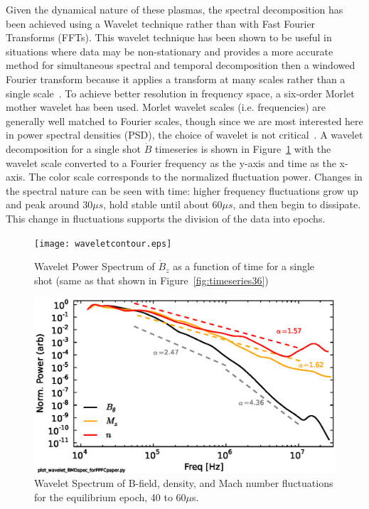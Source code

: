 \documentclass[12pt]{iopart}
\begin{document}
Given the dynamical nature of these plasmas, the spectral decomposition has been achieved using a Wavelet technique rather than with Fast Fourier Transforms (FFTs). This wavelet technique has been shown to be useful in situations where data may be non-stationary and provides a more accurate method for simultaneous spectral and temporal decomposition then a windowed Fourier transform because it applies a transform at many scales rather than a single scale~\cite{torrence98}. To achieve better resolution in frequency space, a six-order Morlet mother wavelet has been used. Morlet wavelet scales (i.e. frequencies) are generally well matched to Fourier scales, though since we are most interested here in power spectral densities (PSD), the choice of wavelet is not critical~\cite{torrence98}. A wavelet decomposition for a single shot $\dot{B}$ timeseries is shown in Figure~\ref{fig:waveletcontour} with the wavelet scale converted to a Fourier frequency as the y-axis and time as the x-axis. The color scale corresponds to the normalized fluctuation power. Changes in the spectral nature can be seen with time: higher frequency fluctuations grow up and peak around 30$\mu s$, hold stable until about 60$\mu s$, and then begin to dissipate. This change in fluctuations supports the division of the data into epochs.
\begin{figure}[!htbp]
\centerline{
\texttt{[image: waveletcontour.eps]}}
\caption{\label{fig:waveletcontour} Wavelet Power Spectrum of $\dot{B}_{z}$ as a function of time for a single shot (same as that shown in Figure~\ref{fig:timeseries36})}
\end{figure}
\begin{figure}[!htbp]
\centerline{
\includegraphics[width=16cm]{waveletspec.eps}}
\caption{\label{fig:waveletspec} Wavelet Spectrum of B-field, density, and Mach number fluctuations for the equilibrium epoch, 40 to 60$\mu$s.}
\end{figure}
\end{document}
